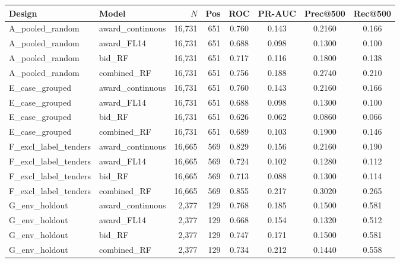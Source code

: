 \begin{tabular}{llrrcccc}
\toprule
Design & Model & $N$ & Pos & ROC & PR-AUC & Prec@500 & Rec@500 \\
\midrule
A\_pooled\_random & award\_continuous & 16,731 & 651 & 0.760 & 0.143 & 0.2160 & 0.166 \\
A\_pooled\_random & award\_FL14 & 16,731 & 651 & 0.688 & 0.098 & 0.1300 & 0.100 \\
A\_pooled\_random & bid\_RF & 16,731 & 651 & 0.717 & 0.116 & 0.1800 & 0.138 \\
A\_pooled\_random & combined\_RF & 16,731 & 651 & 0.756 & 0.188 & 0.2740 & 0.210 \\
E\_case\_grouped & award\_continuous & 16,731 & 651 & 0.760 & 0.143 & 0.2160 & 0.166 \\
E\_case\_grouped & award\_FL14 & 16,731 & 651 & 0.688 & 0.098 & 0.1300 & 0.100 \\
E\_case\_grouped & bid\_RF & 16,731 & 651 & 0.626 & 0.062 & 0.0860 & 0.066 \\
E\_case\_grouped & combined\_RF & 16,731 & 651 & 0.689 & 0.103 & 0.1900 & 0.146 \\
F\_excl\_label\_tenders & award\_continuous & 16,665 & 569 & 0.829 & 0.156 & 0.2160 & 0.190 \\
F\_excl\_label\_tenders & award\_FL14 & 16,665 & 569 & 0.724 & 0.102 & 0.1280 & 0.112 \\
F\_excl\_label\_tenders & bid\_RF & 16,665 & 569 & 0.713 & 0.088 & 0.1300 & 0.114 \\
F\_excl\_label\_tenders & combined\_RF & 16,665 & 569 & 0.855 & 0.217 & 0.3020 & 0.265 \\
G\_env\_holdout & award\_continuous & 2,377 & 129 & 0.768 & 0.185 & 0.1500 & 0.581 \\
G\_env\_holdout & award\_FL14 & 2,377 & 129 & 0.668 & 0.154 & 0.1320 & 0.512 \\
G\_env\_holdout & bid\_RF & 2,377 & 129 & 0.747 & 0.171 & 0.1500 & 0.581 \\
G\_env\_holdout & combined\_RF & 2,377 & 129 & 0.734 & 0.212 & 0.1440 & 0.558 \\
\bottomrule
\end{tabular}
